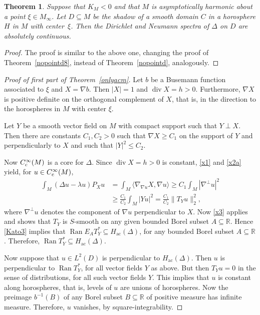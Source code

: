 \documentclass[pdftex]{sigma}
\numberwithin{equation}{section}
\newtheorem{Theorem}{Theorem}[section]
\DeclareMathOperator{\diver}{div}
\DeclareMathOperator{\ran}{Ran}
\def\ac{\mathrm{ac}}
\def\R{\mathbb R}
\begin{document}
\begin{Theorem}%
Suppose that $K_M<0$ and that $M$ is asymptotically harmonic about a point $\xi\in M_\infty$.
Let $D\subseteq M$ be the shadow of a smooth domain $C$ in a horosphere $H$ in $M$ with center~$\xi$.
Then the Dirichlet and Neumann spectra of $\Delta$ on $D$ are absolutely continuous.
\end{Theorem}

\begin{proof}
The proof is similar to the above one,
changing the proof of Theorem~\ref{nopointd8}, instead of Theorem~\ref{nopointd}, analogously.
\end{proof}

\begin{proof}[Proof of first part of Theorem~\ref{onlyacm}]
Let $b$ be a Busemann function associated to $\xi$ and ${X=\nabla b}$.
Then $|X|=1$ and $\diver X=h>0$.
Furthermore, $\nabla X$ is positive definite on the orthogonal complement of $X$,
that is, in the direction to the horospheres in $M$ with center $\xi$.

Let $Y$ be a smooth vector field on $M$ with compact support such that $Y\perp X$.
Then there are constants $C_1,C_2>0$ such that $\nabla X\ge C_1$ on the support of $Y$ and perpendicularly to $X$
and such that $|Y|^2\le C_2$.

Now $C^\infty_{\rm c}(M)$ is a core for $\Delta$.
Since $\diver X=h>0$ is constant, \eqref{x1} and \eqref{x2a} yield, for $u\in C^\infty_{\rm c}(M)$,
\begin{align*}
 \int_M (\Delta u-\lambda u) P_Xu
 &= \int_M \langle\nabla_{\nabla u}X,\nabla u\rangle \ge C_1 \int_M|\nabla^\bot u|^2 \\
 &\ge \frac{C_1}{C_2}\int_M|Yu|^2 = \frac{C_1}{C_2}\|T_Yu\|_2^2,
\end{align*}
where $\nabla^\bot u$ denotes the component of $\nabla u$ perpendicular to $X$.
Now \eqref{x3} applies and shows that $T_Y$ is $S$-smooth on any given bounded Borel subset $A\subseteq\R$.
Hence \eqref{Kato3} implies that $\ran E_AT_Y^*\subseteq H_{\ac}(\Delta)$,
for any bounded Borel subset $A\subseteq\R$.
Therefore, $\ran T_Y^*\subseteq H_{\ac}(\Delta)$.

Now suppose that $u\in L^2(D )$ is perpendicular to $H_{\ac}(\Delta)$.
Then $u$ is perpendicular to $\ran T_Y^*$, for all vector fields $Y$ as above.
But then $T_Yu=0$ in the sense of distributions, for all such vector fields $Y$.
This implies that $u$ is constant along horospheres, that is, levels of $u$ are unions of horospheres.
Now the preimage $b^{-1}(B)$ of any Borel subset $B\subseteq\R$ of positive measure has infinite measure.
Therefore, $u$ vanishes, by square-integrability.
\end{proof}
\end{document}
